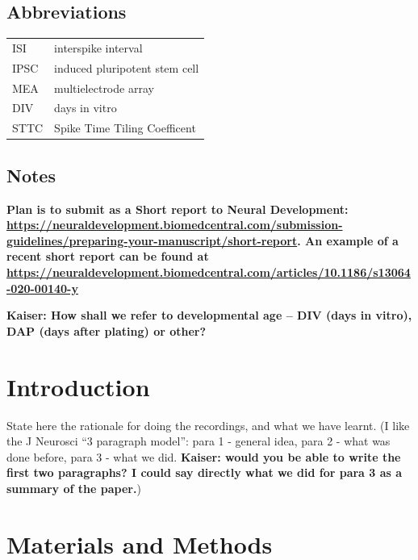 \documentclass[doublespacing]{bmcart}
\begin{document}
\begin{frontmatter}
\begin{abstractbox}
\begin{keyword}
\end{keyword}

\end{abstractbox}

\subsection*{Abbreviations}
\begin{tabular}{ll}
  ISI & interspike interval\\
  IPSC & induced pluripotent stem cell\\
  MEA & multielectrode array\\
  DIV & days in vitro\\
  STTC & Spike Time Tiling Coefficent\\
\end{tabular}

\end{frontmatter}



\subsection*{Notes}
\textbf{Plan is to submit as a Short report to Neural Development:
  \url{https://neuraldevelopment.biomedcentral.com/submission-guidelines/preparing-your-manuscript/short-report}.
  An example of a recent short report can be found at 
\url{https://neuraldevelopment.biomedcentral.com/articles/10.1186/s13064-020-00140-y}}



\textbf{Kaiser: How shall we refer to developmental age -- DIV (days in
  vitro), DAP (days after plating) or other?}

\section*{Introduction}
State here the rationale for doing the recordings, and what we have
learnt.  (I like the J Neurosci ``3 paragraph model'': para 1 -
general idea, para 2 - what was done before, para 3 - what we did.  \textbf{Kaiser: would you be able to write the first two paragraphs?  I could say directly what we did for para 3 as a summary of the paper.})

\section*{Materials and Methods}
\end{document}
